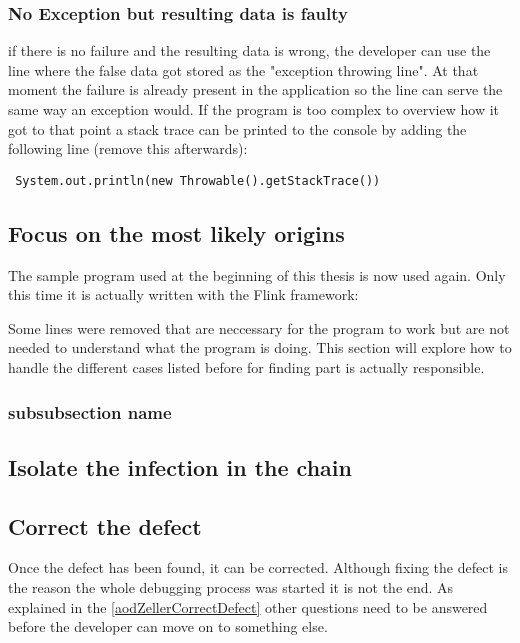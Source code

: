 \subsubsection{No Exception but resulting data is faulty}
if there is no failure and the resulting data is wrong, the developer can use the line where the false data got stored as the "exception throwing line". At that moment the failure is already present in the application so the line can serve the same way an exception would. If the program is too complex to overview how it got to that point a stack trace can be printed to the console by adding the following line (remove this afterwards):
\begin{lstlisting}
 System.out.println(new Throwable().getStackTrace())
\end{lstlisting}

\subsection{Focus on the most likely origins}
The sample program used at the beginning of this thesis is now used again. Only this time it is actually written with the Flink framework:



Some lines were removed that are neccessary for the program to work but are not needed to understand what the program is doing. This section will explore how to handle the different cases listed before for finding part is actually responsible.

\subsubsection{subsubsection name}


\subsection{Isolate the infection in the chain}

\subsection{Correct the defect}
Once the defect has been found, it can be corrected. Although fixing the defect is the reason the whole debugging process was started it is not the end. As explained in the \ref{aodZellerCorrectDefect} other questions need to be answered before the developer can move on to something else.

